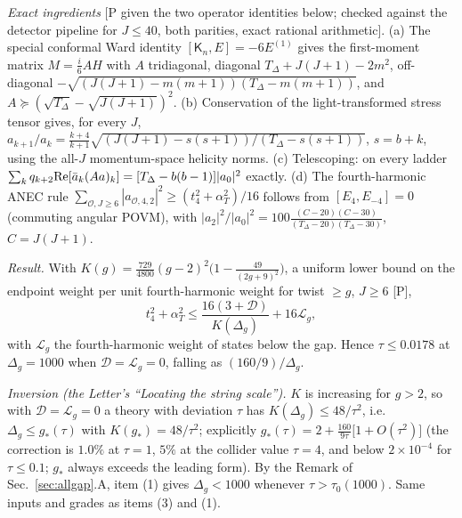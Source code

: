 \documentclass[aps,prl,onecolumn,superscriptaddress,nofootinbib]{revtex4-2}
\begin{document}
\emph{Exact ingredients} [P given the two operator identities below; checked against the detector pipeline for $J\le40$, both
parities, exact rational arithmetic]. (a) The special conformal Ward identity $[\mathsf K_n,E]=-6E^{(1)}$ gives the first-moment
matrix $M=\frac i6AH$ with $A$ tridiagonal, diagonal $T_\Delta+J(J+1)-2m^2$, off-diagonal $-\sqrt{(J(J+1)-m(m+1))(T_\Delta-m(m+1))}$,
and $A\succeq(\sqrt{T_\Delta}-\sqrt{J(J+1)})^2$. (b) Conservation of the light-transformed stress tensor gives, for every $J$,
$a_{k+1}/a_k=\frac{k+4}{k+1}\sqrt{(J(J+1)-s(s+1))/(T_\Delta-s(s+1))}$, $s=b+k$, using the all-$J$ momentum-space helicity norms.
(c) Telescoping: on every ladder $\sum_kq_{k+2}{\rm Re}[\bar a_k(Aa)_k]=[T_\Delta-b(b-1)]|a_0|^2$ exactly. (d) The fourth-harmonic
ANEC rule $\sum_{\mathcal O,J\ge6}|a_{\mathcal O,4,2}|^2\ge(t_4^2+\alpha_T^2)/16$ follows from $[E_4,E_{-4}]=0$ (commuting angular POVM),
with $|a_2|^2/|a_0|^2=100\frac{(C-20)(C-30)}{(T_\Delta-20)(T_\Delta-30)}$, $C=J(J+1)$.

\emph{Result.} With $K(g)=\frac{729}{4800}(g-2)^2\big(1-\frac{49}{(2g+9)^2}\big)$, a uniform lower bound on the endpoint weight per unit
fourth-harmonic weight for twist $\ge g$, $J\ge6$ [P],
\[
t_4^2+\alpha_T^2\le\frac{16(3+\mathcal D)}{K(\Delta_g)}+16\mathcal L_g ,
\]
with $\mathcal L_g$ the fourth-harmonic weight of states below the gap. Hence $\tau\le0.0178$ at $\Delta_g=1000$ when
$\mathcal D=\mathcal L_g=0$, falling as $(160/9)/\Delta_g$.

\emph{Inversion (the Letter's ``Locating the string scale'').} $K$ is increasing for $g>2$, so with $\mathcal D=\mathcal L_g=0$ a theory with
deviation $\tau$ has $K(\Delta_g)\le48/\tau^2$, i.e.\ $\Delta_g\le g_*(\tau)$ with $K(g_*)=48/\tau^2$; explicitly
$g_*(\tau)=2+\frac{160}{9\tau}\big[1+O(\tau^2)\big]$ (the correction is $1.0\%$ at $\tau=1$, $5\%$ at the collider value $\tau=4$, and below $2\times10^{-4}$ for $\tau\le0.1$; $g_*$ always exceeds the leading form). By the Remark of
Sec.~\ref{sec:allgap}.A, item (1) gives $\Delta_g<1000$ whenever $\tau>\tau_0(1000)$. Same inputs and grades as items (3) and (1).
\end{document}
